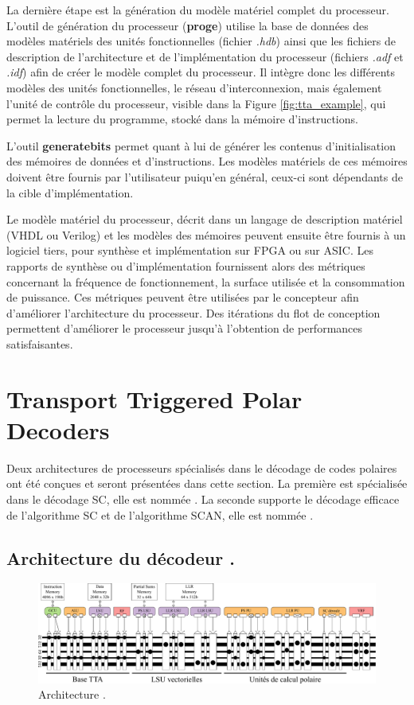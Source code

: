 La dernière étape est la génération du modèle matériel complet du processeur. L'outil de génération du processeur (\textbf{proge}) utilise la base de données des modèles matériels des unités fonctionnelles (fichier \textit{.hdb}) ainsi que les fichiers de description de l'architecture et de l'implémentation du processeur (fichiers \textit{.adf} et \textit{.idf}) afin de créer le modèle complet du processeur. Il intègre donc les différents modèles des unités fonctionnelles, le réseau d'interconnexion, mais également l'unité de contrôle du processeur, visible dans la Figure \ref{fig:tta_example}, qui permet la lecture du programme, stocké dans la mémoire d'instructions.

L'outil \textbf{generatebits} permet quant à lui de générer les contenus d'initialisation des mémoires de données et d'instructions. Les modèles matériels de ces mémoires doivent être fournis par l'utilisateur puiqu'en général, ceux-ci sont dépendants de la cible d'implémentation.

Le modèle matériel du processeur, décrit dans un langage de description matériel (VHDL ou Verilog) et les modèles des mémoires peuvent ensuite être fournis à un logiciel tiers, pour synthèse et implémentation sur FPGA ou sur ASIC. Les rapports de synthèse ou d'implémentation fournissent alors des métriques concernant la fréquence de fonctionnement, la surface utilisée et la consommation de puissance. Ces métriques peuvent être utilisées par le concepteur afin d'améliorer l'architecture du processeur. Des itérations du flot de conception permettent d'améliorer le processeur jusqu'à l'obtention de performances satisfaisantes.



\section{Transport Triggered Polar Decoders}
Deux architectures de processeurs spécialisés dans le décodage de codes polaires ont été conçues et seront présentées dans cette section. La première est spécialisée dans le décodage SC, elle est nommée \TTSC. La seconde supporte le décodage efficace de l'algorithme SC et de l'algorithme SCAN, elle est nommée \TTSCAN.

\subsection{Architecture du décodeur \TTSC.}

\begin{figure}[t]
	\centering
	\includegraphics[width=\textwidth]{main/ch4_fig/archi_sc}
	\caption{Architecture \TTSC.}
	\label{fig:prode}
\end{figure}

